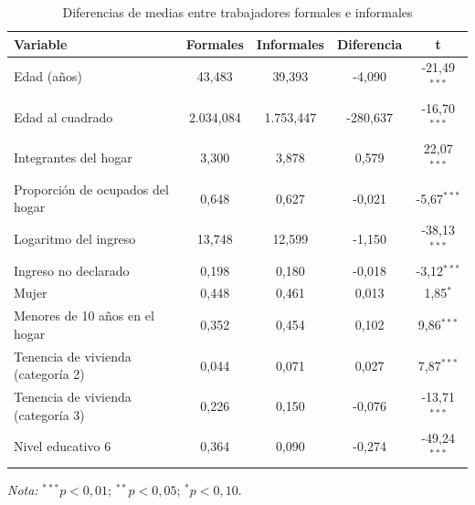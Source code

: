 \begin{table}[H]
\centering
\caption{Diferencias de medias entre trabajadores formales e informales}
\label{tab:dif_medias_resumen}
\begin{tabular}{lcccc}
\toprule
Variable & Formales & Informales & Diferencia & t \\
\midrule
Edad (años) & 43,483 & 39,393 & -4,090 & -21,49$^{***}$ \\
Edad al cuadrado & 2.034,084 & 1.753,447 & -280,637 & -16,70$^{***}$ \\
Integrantes del hogar & 3,300 & 3,878 & 0,579 & 22,07$^{***}$ \\
Proporción de ocupados del hogar & 0,648 & 0,627 & -0,021 & -5,67$^{***}$ \\
Logaritmo del ingreso & 13,748 & 12,599 & -1,150 & -38,13$^{***}$ \\
Ingreso no declarado & 0,198 & 0,180 & -0,018 & -3,12$^{***}$ \\
Mujer & 0,448 & 0,461 & 0,013 & 1,85$^{*}$ \\
Menores de 10 años en el hogar & 0,352 & 0,454 & 0,102 & 9,86$^{***}$ \\
Tenencia de vivienda (categoría 2) & 0,044 & 0,071 & 0,027 & 7,87$^{***}$ \\
Tenencia de vivienda (categoría 3) & 0,226 & 0,150 & -0,076 & -13,71$^{***}$ \\
Nivel educativo 6 & 0,364 & 0,090 & -0,274 & -49,24$^{***}$ \\
\bottomrule
\end{tabular}
\vspace{0.2cm}
\hspace{1cm}\parbox{\linewidth}{\footnotesize\textit{Nota:} $^{***}p<0{,}01$; $^{**}p<0{,}05$; $^{*}p<0{,}10$.}
\end{table}